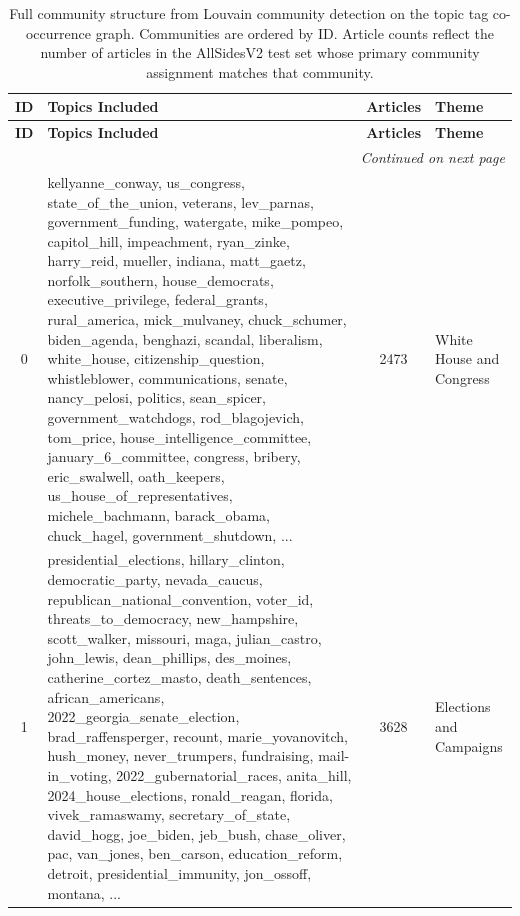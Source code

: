 \begin{tiny}
\begin{longtable}{c p{} c p{}}
\caption{Full community structure from Louvain community detection on the topic tag co-occurrence graph. Communities are ordered by ID. Article counts reflect the number of articles in the AllSidesV2 test set whose primary community assignment matches that community.}
\label{tab:community-structure} \\
\toprule
\textbf{ID} & \textbf{Topics Included} & \textbf{Articles} & \textbf{Theme} \\
\midrule
\endfirsthead

\toprule
\textbf{ID} & \textbf{Topics Included} & \textbf{Articles} & \textbf{Theme} \\
\midrule
\endhead

\midrule
\multicolumn{4}{r}{\textit{Continued on next page}} \\
\endfoot

\bottomrule
\endlastfoot

0 & kellyanne\_conway, us\_congress, state\_of\_the\_union, veterans, lev\_parnas, government\_funding, watergate, mike\_pompeo, capitol\_hill, impeachment, ryan\_zinke, harry\_reid, mueller, indiana, matt\_gaetz, norfolk\_southern, house\_democrats, executive\_privilege, federal\_grants, rural\_america, mick\_mulvaney, chuck\_schumer, biden\_agenda, benghazi, scandal, liberalism, white\_house, citizenship\_question, whistleblower, communications, senate, nancy\_pelosi, politics, sean\_spicer, government\_watchdogs, rod\_blagojevich, tom\_price, house\_intelligence\_committee, january\_6\_committee, congress, bribery, eric\_swalwell, oath\_keepers, us\_house\_of\_representatives, michele\_bachmann, barack\_obama, chuck\_hagel, government\_shutdown, ... & 2473 & White House and Congress \\
\midrule

1 & presidential\_elections, hillary\_clinton, democratic\_party, nevada\_caucus, republican\_national\_convention, voter\_id, threats\_to\_democracy, new\_hampshire, scott\_walker, missouri, maga, julian\_castro, john\_lewis, dean\_phillips, des\_moines, catherine\_cortez\_masto, death\_sentences, african\_americans, 2022\_georgia\_senate\_election, brad\_raffensperger, recount, marie\_yovanovitch, hush\_money, never\_trumpers, fundraising, mail-in\_voting, 2022\_gubernatorial\_races, anita\_hill, 2024\_house\_elections, ronald\_reagan, florida, vivek\_ramaswamy, secretary\_of\_state, david\_hogg, joe\_biden, jeb\_bush, chase\_oliver, pac, van\_jones, ben\_carson, education\_reform, detroit, presidential\_immunity, jon\_ossoff, montana, ... & 3628 & Elections and Campaigns \\
\midrule


\end{longtable}
\end{tiny}
